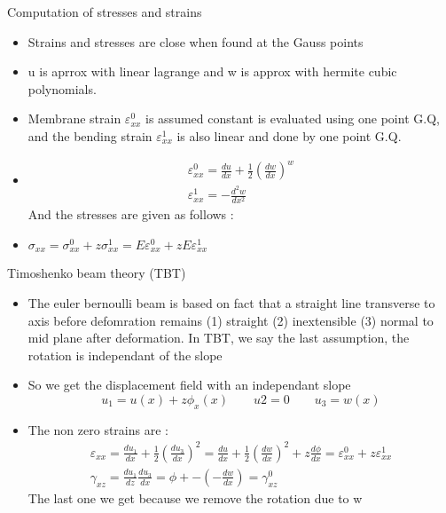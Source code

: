 	\begin{frame}{Computation of stresses and strains}
		\begin{itemize}
			\item Strains and stresses are close when found at the Gauss points
			\item u is aprrox with linear lagrange and w is approx with hermite cubic polynomials.
			\item Membrane strain $\varepsilon^0_{xx}$ is assumed constant is evaluated using one point G.Q, and the bending strain $\varepsilon^1_{xx}$ is also linear and done by one point G.Q.
			\item 
			\begin{equation}
			\begin{aligned}
				\varepsilon^0_{xx} = \frac{du}{dx} + \frac{1}{2}\left(\frac{dw}{dx} \right)^w \\ 
				\varepsilon^1_{xx} = -\frac{d^2w}{dx^2}
			\end{aligned}
			\end{equation}
			And the stresses are given as follows :
			\item $\sigma_{xx} = \sigma_{xx}^0 + z\sigma_{xx}^1 = E \varepsilon_{xx}^0 + z E \varepsilon_{xx}^1$ \\
			
		\end{itemize}
	\end{frame}



	\begin{frame}{Timoshenko beam theory (TBT)}
		\begin{itemize}
			\item The euler bernoulli beam is based on fact that a straight line transverse to axis before defomration remains (1) straight (2) inextensible (3) normal to mid plane after deformation. In TBT, we say the last assumption, the rotation is independant of the slope
			\item So we get the displacement field with an independant slope
			\begin{equation}
				u_1 = u(x) + z \phi_x(x) \qquad u2 = 0 \qquad u_3 = w(x)
			\end{equation} 
			\item The non zero strains are :
			\begin{equation}
			\begin{aligned}
				\varepsilon_{xx} = \frac{du_1}{dx} + \frac{1}{2}(\frac{du_3}{dx})^2 = \frac{du}{dx} + \frac{1}{2}(\frac{dw}{dx})^2 + z \frac{d\phi}{dx} = \varepsilon^0_{xx} + z\varepsilon^1_{xx} \\
				\gamma_{xz} = \frac{du_1}{dz}  \frac{du_3}{dx} = \phi + - \left(-\frac{dw}{dx} \right) = \gamma_{xz}^0
			\end{aligned}
			\end{equation}	
			The last one we get because we remove the rotation due to w
		\end{itemize}
	\end{frame}


